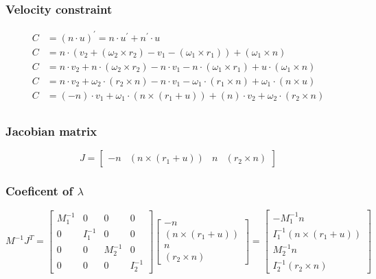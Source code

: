 \documentclass{article}
\begin{document}
		\subsubsection{Velocity constraint}
		\begin{align*}
		C &= (n\cdot u)^{'} = n\cdot u^{'} + n^{'}\cdot u\\
		C &= n\cdot (v_2+(\omega_2\times r_2)-v_1-(\omega_1\times r_1)) + (\omega_1\times n)\\
		C &= n\cdot v_2+ n\cdot (\omega_2\times r_2)- n\cdot v_1-n\cdot (\omega_1\times r_1) + u\cdot(\omega_1\times n)\\
		C &= n\cdot v_2+ \omega_2\cdot (r_2\times n)- n\cdot v_1-\omega_1\cdot (r_1\times n) + \omega_1\cdot(n\times u)\\
		C &= \boxed{(-n)}\cdot v_1 + \omega_1\cdot\boxed{(n\times(r_1+u))} +\boxed{(n)}\cdot v_2+ \omega_2\cdot \boxed{(r_2\times n)}\\
		\end{align*}
		\subsubsection{Jacobian matrix}
		$$
		J = 
		\begin{bmatrix}
		-n & (n\times(r_1+u)) & n & (r_2\times n)
		\end{bmatrix}
		$$
		\subsubsection{Coeficent of $\lambda$}
		$$
		M^{-1}J^T=	
		\begin{bmatrix}
		M_1^{-1} 	& 0 		& 0 		& 0\\
		0 			& I_1^{-1} 	& 0 		& 0\\
		0 			& 0 		& M_2^{-1} 	& 0\\
		0 			& 0 		& 0 		& I_2^{-1}
		\end{bmatrix}
		\begin{bmatrix}
		-n\\
		(n\times(r_1+u))\\
		n\\
		(r_2\times n)
		\end{bmatrix}
		=
		\begin{bmatrix}
		-M_1^{-1}n\\
		I_1^{-1}(n\times(r_1+u))\\
		M_2^{-1}n\\
		I_2^{-1}(r_2\times n)
		\end{bmatrix}
		$$
\end{document}
